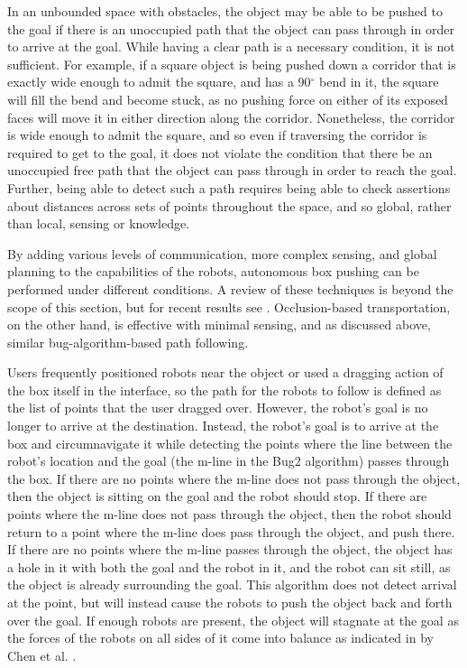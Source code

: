 In an unbounded space with obstacles, the object may be able to be pushed to the goal if there is an unoccupied path that the object can pass through in order to arrive at the goal. 
While having a clear path is a necessary condition, it is not sufficient. 
For example, if a square object is being pushed down a corridor that is exactly wide enough to admit the square, and has a 90$^{\circ}$ bend in it, the square will fill the bend and become stuck, as no pushing force on either of its exposed faces will move it in either direction along the corridor. 
Nonetheless, the corridor is wide enough to admit the square, and so even if traversing the corridor is required to get to the goal, it does not violate the condition that there be an unoccupied free path that the object can pass through in order to reach the goal. 
Further, being able to detect such a path requires being able to check assertions about distances across sets of points throughout the space, and so global, rather than local, sensing or knowledge. 

By adding various levels of communication, more complex sensing, and global planning to the capabilities of the robots, autonomous box pushing can be performed under different conditions. 
A review of these techniques is beyond the scope of this section, but for recent results see \citep{tuci2018cooperative, rahimi2018comparison, alkilabi2017cooperative}. 
Occlusion-based transportation, on the other hand, is effective with minimal sensing, and as discussed above, similar bug-algorithm-based path following. 

Users frequently positioned robots near the object or used a dragging action of the box itself in the interface, so the path for the robots to follow is defined as the list of points that the user dragged over. 
However, the robot's goal is no longer to arrive at the destination.
Instead, the robot's goal is to arrive at the box and circumnavigate it while detecting the points where the line between the robot's location and the goal (the m-line in the Bug2 algorithm) passes through the box. 
If there are no points where the m-line does not pass through the object, then the object is sitting on the goal and the robot should stop. 
If there are points where the m-line does not pass through the object, then the robot should return to a point where the m-line does pass through the object, and push there. 
If there are no points where the m-line passes through the object, the object has a hole in it with both the goal and the robot in it, and the robot can sit still, as the object is already surrounding the goal.
This algorithm does not detect arrival at the point, but will instead cause the robots to push the object back and forth over the goal. 
If enough robots are present, the object will stagnate at the goal as the forces of the robots on all sides of it come into balance as indicated in by Chen et al. \cite{chen2015occlusion}.

